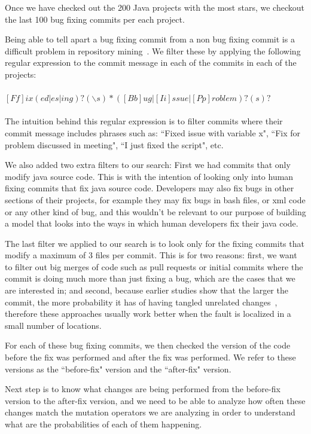 \documentclass[conference]{IEEEtran}
\begin{document}
Once we have checked out the 200 Java projects with the most stars, we checkout 
the last 100 bug fixing commits per each project. 

Being able to tell apart a bug fixing commit from a non bug fixing commit is a difficult problem in repository mining~\cite{Bird09}. We filter these by applying the following regular expression to the commit message in each of the commits in each of the projects:
\\
\\
$[Ff]ix(ed|es|ing)?(\backslash s)*([Bb]ug|[Ii]ssue|[Pp]roblem)?(s)?$
\\
\\
The intuition behind this regular expression is to filter commits where their 
commit message includes phrases such as: ``Fixed issue with variable x", ``Fix for 
problem discussed in meeting", ``I just fixed the script", etc.

We also added two extra filters to our search: First we had commits that only 
modify java source code. This is with the intention of looking only into human 
fixing commits that fix java source code. Developers may also fix bugs in other 
sections of their projects, for example they may fix bugs in bash files, or xml 
code or any other kind of bug, and this wouldn't be relevant to our purpose of 
building a model that looks into the ways in which human developers fix their 
java code.

The last filter we applied to our search is to look only for the fixing commits 
that modify a maximum of 3 files per commit. This is for two reasons: first, we 
want to filter out big merges of code such as pull requests or initial commits 
where the commit is doing much more than just fixing a bug, which are the cases 
that we are interested in; and second, because earlier studies show that the larger the commit, the more probability it has of having tangled unrelated changes~\cite{Dias15,Herzig13,Matsuda15,Kawrykow11}, therefore these approaches usually work 
better when the fault is localized in a small number of locations.

For each of these bug fixing commits, we then checked the version of the code 
before the fix was performed and after the fix was performed. We refer to these 
versions as the ``before-fix" version and the ``after-fix" version.

Next step is to know what changes are being performed from the before-fix version to 
the after-fix version, and we need to be able to analyze how often these changes match the mutation operators we are analyzing in order to understand what are 
the probabilities of each of them happening.
\end{document}
